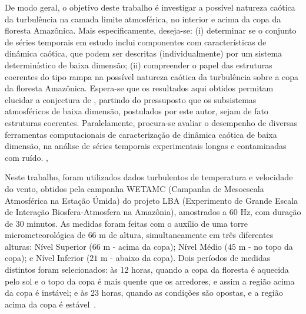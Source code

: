De modo geral, o objetivo deste trabalho é investigar a possível natureza caótica da turbulência na camada limite atmosférica, no interior e acima da copa da floresta Amazônica. Mais especificamente, deseja-se: (i) determinar se o conjunto de séries temporais em estudo inclui componentes com características de dinâmica caótica, que podem ser descritas (individualmente) por um sistema determinístico de baixa dimensão; (ii) compreender o papel das estruturas coerentes do tipo rampa na possível natureza caótica da turbulência sobre a copa da floresta Amazônica. Espera-se que os resultados aqui obtidos permitam elucidar a conjectura de , partindo do pressuposto que os subsistemas atmosféricos de baixa dimensão, postulados por este autor, sejam de fato estruturas coerentes. Paralelamente, procura-se avaliar o desempenho de diversas ferramentas computacionais de caracterização de dinâmica caótica de baixa dimensão, na análise de séries temporais experimentais longas e contaminadas com ruído. \cite{sousa:2004},

Neste trabalho, foram utilizados dados turbulentos de temperatura e velocidade do vento, obtidos pela campanha WETAMC (Campanha de Mesoescala Atmosférica na Estação Úmida) do projeto LBA (Experimento de Grande Escala de Interação Biosfera-Atmosfera na Amazônia), amostrados a $60$ Hz, com duração de $30$ minutos. As medidas foram feitas com o auxílio de uma torre micrometeorológica de $66$ m de altura, simultaneamente em três diferentes alturas: Nível Superior ($66$ m - acima da copa); Nível Médio ($45$ m -  no topo da copa); e Nível Inferior ($21$ m - abaixo da copa). Dois períodos de medidas distintos foram selecionados: às 12 horas, quando a copa da floresta é aquecida pelo sol e o topo da copa é mais quente que os arredores, e assim a região acima da copa é instável; e às 23 horas, quando as condições são opostas, e a região acima da copa é estável~\cite{Ramos/04}.

